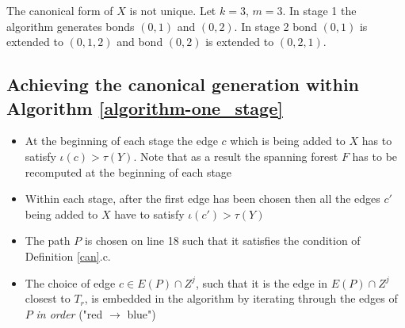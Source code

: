 \begin{exmp*}
	The canonical form of $X$ is not unique.
	Let $k = 3$, $m = 3$. In stage 1 the algorithm generates bonds $(0,1)$ and $(0,2)$. In stage 2 bond $(0,1)$ is extended to $(0,1,2)$ and bond $(0,2)$ is extended to $(0,2,1)$.

	\begin{center}
		
	\end{center}

\vspace{-0.5cm}
\end{exmp*}

\subsection*{Achieving the canonical generation within Algorithm \ref{algorithm-one_stage}}

\begin{itemize}
	\item At the beginning of each stage the edge $c$ which is being added to $X$ has to satisfy $\iota(c) > \tau(Y)$. Note that as a result the spanning forest $F$ has to be recomputed at the beginning of each stage

	\item Within each stage, after the first edge has been chosen then all the edges $c'$ being added to $X$ have to satisfy $\iota(c') > \tau(Y)$

	\item The path $P$ is chosen on line 18 such that it satisfies the condition of Definition \ref{can}.c.

	\item The choice of edge $c \in E(P) \cap Z^j$, such that it is the edge in $E(P) \cap Z^j$ closest to $T_r$, is embedded in the algorithm by iterating through the edges of $P$ \textit{in order} ("red $\rightarrow$ blue")

\end{itemize}

\clearpage

